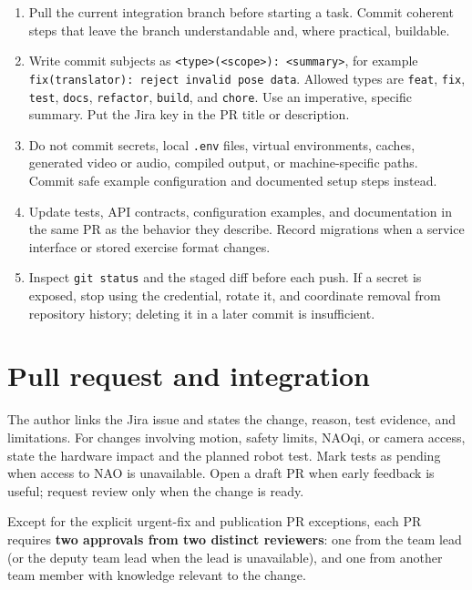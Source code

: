 \documentclass[12pt,a4paper]{article}
\begin{document}
\begin{enumerate}

\item Pull the current integration branch before starting a task. Commit coherent steps that leave the branch understandable and, where practical, buildable.

\item Write commit subjects as \texttt{\textless{}type\textgreater{}(\textless{}scope\textgreater{}): \textless{}summary\textgreater{}}, for example \texttt{fix(translator): reject invalid pose data}. Allowed types are \texttt{feat}, \texttt{fix}, \texttt{test}, \texttt{docs}, \texttt{refactor}, \texttt{build}, and \texttt{chore}. Use an imperative, specific summary. Put the Jira key in the PR title or description.

\item Do not commit secrets, local \texttt{.env} files, virtual environments, caches, generated video or audio, compiled output, or machine-specific paths. Commit safe example configuration and documented setup steps instead.

\item Update tests, API contracts, configuration examples, and documentation in the same PR as the behavior they describe. Record migrations when a service interface or stored exercise format changes.

\item Inspect \texttt{git status} and the staged diff before each push. If a secret is exposed, stop using the credential, rotate it, and coordinate removal from repository history; deleting it in a later commit is insufficient.

\end{enumerate}

\section{Pull request and integration}

The author links the Jira issue and states the change, reason, test evidence, and limitations. For changes involving motion, safety limits, NAOqi, or camera access, state the hardware impact and the planned robot test. Mark tests as pending when access to NAO is unavailable. Open a draft PR when early feedback is useful; request review only when the change is ready.

Except for the explicit urgent-fix and publication PR exceptions,
each PR requires \textbf{two approvals from two distinct reviewers}:
one from the team lead (or the deputy team lead when the lead is
unavailable), and one from another team member with knowledge
relevant to the change.
\end{document}
